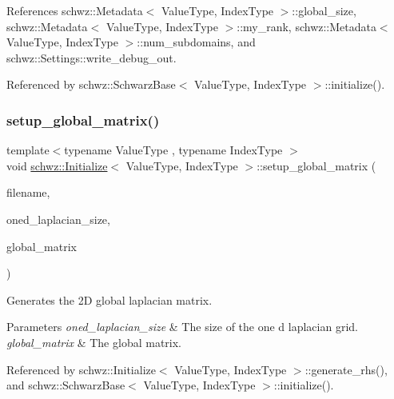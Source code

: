 References schwz\+::\+Metadata$<$ Value\+Type, Index\+Type $>$\+::global\+\_\+size, schwz\+::\+Metadata$<$ Value\+Type, Index\+Type $>$\+::my\+\_\+rank, schwz\+::\+Metadata$<$ Value\+Type, Index\+Type $>$\+::num\+\_\+subdomains, and schwz\+::\+Settings\+::write\+\_\+debug\+\_\+out.



Referenced by schwz\+::\+Schwarz\+Base$<$ Value\+Type, Index\+Type $>$\+::initialize().

\mbox{\label{classschwz_1_1Initialize_af655816bbed181e0a243efa7e35e942f}} 
\subsubsection{\texorpdfstring{setup\+\_\+global\+\_\+matrix()}{setup\_global\_matrix()}}
{\footnotesize\ttfamily template$<$typename Value\+Type , typename Index\+Type $>$ \\
void \hyperlink{classschwz_1_1Initialize}{schwz\+::\+Initialize}$<$ Value\+Type, Index\+Type $>$\+::setup\+\_\+global\+\_\+matrix (\begin{DoxyParamCaption}\item[{const std\+::string \&}]{filename,  }\item[{const gko\+::size\+\_\+type \&}]{oned\+\_\+laplacian\+\_\+size,  }\item[{std\+::shared\+\_\+ptr$<$ gko\+::matrix\+::\+Csr$<$ Value\+Type, Index\+Type $>$$>$ \&}]{global\+\_\+matrix }\end{DoxyParamCaption})}



Generates the 2D global laplacian matrix. 


\begin{DoxyParams}{Parameters}
{\em oned\+\_\+laplacian\+\_\+size} & The size of the one d laplacian grid. \\
\hline
{\em global\+\_\+matrix} & The global matrix. \\
\hline
\end{DoxyParams}


Referenced by schwz\+::\+Initialize$<$ Value\+Type, Index\+Type $>$\+::generate\+\_\+rhs(), and schwz\+::\+Schwarz\+Base$<$ Value\+Type, Index\+Type $>$\+::initialize().

